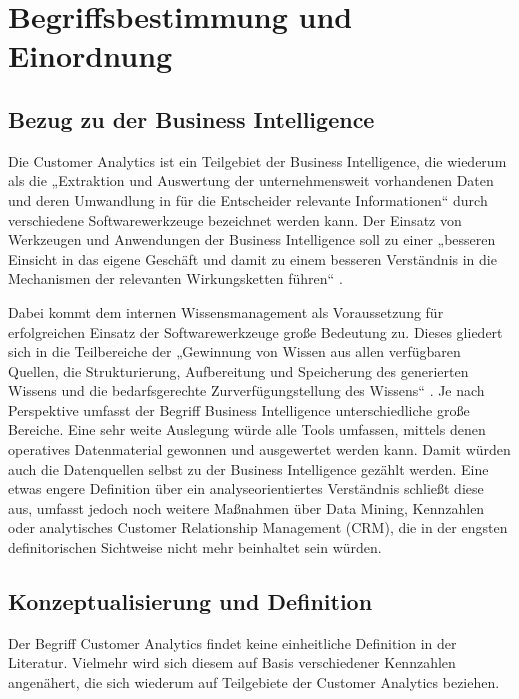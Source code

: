 \section{Begriffsbestimmung und Einordnung}
\label{sec:begriffsbestimmung_einordnung}

\subsection{Bezug zu der Business Intelligence}
Die Customer Analytics ist ein Teilgebiet der Business Intelligence, die wiederum als die „Extraktion und Auswertung der unternehmensweit vorhandenen Daten und deren Umwandlung in für die Entscheider relevante Informationen“ \cite[S. 6]{hannig2002} durch verschiedene Softwarewerkzeuge bezeichnet werden kann.
Der Einsatz von Werkzeugen und Anwendungen der Business Intelligence soll zu einer „besseren Einsicht in das eigene Geschäft und damit zu einem besseren Verständnis in die Mechanismen der relevanten Wirkungsketten führen“ \cite[S. 32]{hannig2002}.

Dabei kommt dem internen Wissensmanagement als Voraussetzung für erfolgreichen Einsatz der Softwarewerkzeuge große Bedeutung zu. Dieses gliedert sich in die Teilbereiche der „Gewinnung von Wissen aus allen verfügbaren Quellen, die Strukturierung, Aufbereitung und Speicherung des generierten Wissens und die bedarfsgerechte Zurverfügungstellung des Wissens“ \cite[S. 16]{hannig2002}.
Je nach Perspektive umfasst der Begriff Business Intelligence unterschiedliche große Bereiche. Eine sehr weite Auslegung würde alle Tools umfassen, mittels denen operatives Datenmaterial gewonnen und ausgewertet werden kann.
Damit würden auch die Datenquellen selbst zu der Business Intelligence gezählt werden. Eine etwas engere Definition über ein analyseorientiertes Verständnis schließt diese aus, umfasst jedoch noch weitere Maßnahmen über Data Mining, Kennzahlen oder analytisches Customer Relationship Management (CRM), die in der engsten definitorischen Sichtweise nicht mehr beinhaltet sein würden.\cite{hannig2002}

\subsection{Konzeptualisierung und Definition}

Der Begriff Customer Analytics findet keine einheitliche Definition in der Literatur. Vielmehr wird sich diesem auf Basis verschiedener Kennzahlen angenähert, die sich wiederum auf Teilgebiete der Customer Analytics beziehen.

